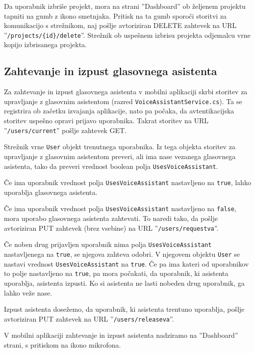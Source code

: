 \documentclass[a4paper, 12pt]{book}
\begin{document}
Da uporabnik izbriše projekt, mora na strani ''Dashboard'' ob željenem projektu tapniti na gumb z ikono smetnjaka.
Pritisk na ta gumb sporoči storitvi za komunikacijo s strežnikom, naj pošlje avtoriziran DELETE zahtevek na URL ''\texttt{/projects/\{id\}/delete}''.
Strežnik ob uspešnem izbrisu projekta odjemalcu vrne kopijo izbrisanega projekta.

\subsection{Zahtevanje in izpust glasovnega asistenta}

Za zahtevanje in izpust glasovnega asistenta v mobilni aplikaciji skrbi storitev za upravljanje z glasovnim asistentom (razred \texttt{VoiceAssistantService.cs}).
Ta se registrira ob začetku izvajanja aplikacije, nato pa počaka, da avtentikacijska storitev uspešno opravi prijavo uporabnika.
Takrat storitev na URL ''\texttt{/users/current}'' pošlje zahtevek GET.

Strežnik vrne \texttt{User} objekt trenutnega uporabnika.
Iz tega objekta storitev za upravljanje z glasovnim asistentom preveri, ali ima nase vezanega glasovnega asistenta, tako da preveri vrednost boolean polja \texttt{UsesVoiceAssistant}.

Če ima uporabnik vrednost polja \texttt{UsesVoiceAssistant} nastavljeno na \texttt{true}, lahko uporablja glasovnega asistenta.

Če ima uporabnik vrednost polja \texttt{UsesVoiceAssistant} nastavljeno na \texttt{false}, mora uporabo glasovnega asistenta zahtevati.
To naredi tako, da pošlje avtoriziran PUT zahtevek (brez vsebine) na URL ''\texttt{/users/requestva}''.

Če noben drug prijavljen uporabnik nima polja \texttt{UsesVoiceAssistant} nastavljenega na \texttt{true}, se njegova zahteva odobri.
V njegovem objektu \texttt{User} se nastavi vrednost \texttt{UsesVoiceAssistant} na \texttt{true}.
Če pa ima kateri od uporabnikov to polje nastavljeno na \texttt{true}, pa mora počakati, da uporabnik, ki asistenta uporablja, asistenta izpusti.
Ko si asistenta ne lasti nobeden drug uporabnik, ga lahko veže nase.

Izpust asistenta dosežemo, da uporabnik, ki asistenta trentuno uporablja, pošlje avtoriziran PUT zahtevek na URL ''\texttt{/users/releaseva}''.

V mobilni aplikaciji zahtevanje in izpust asistenta nadziramo na ''Dashboard'' strani, s pritiskom na ikono mikrofona.
\end{document}
